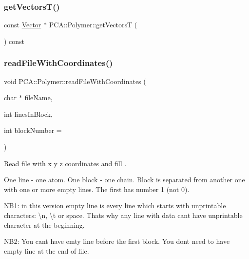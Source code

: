 \subsubsection{\texorpdfstring{get\+Vectors\+T()}{getVectorsT()}}
{\footnotesize\ttfamily const \hyperlink{class_p_c_a_1_1_vector}{Vector} $\ast$ P\+C\+A\+::\+Polymer\+::get\+VectorsT (\begin{DoxyParamCaption}{ }\end{DoxyParamCaption}) const}

\hypertarget{class_p_c_a_1_1_polymer_a777691bb321ef1da30a064757eb480c7}{}\label{class_p_c_a_1_1_polymer_a777691bb321ef1da30a064757eb480c7} 
\subsubsection{\texorpdfstring{read\+File\+With\+Coordinates()}{readFileWithCoordinates()}}
{\footnotesize\ttfamily void P\+C\+A\+::\+Polymer\+::read\+File\+With\+Coordinates (\begin{DoxyParamCaption}\item[{char $\ast$}]{file\+Name,  }\item[{int}]{lines\+In\+Block,  }\item[{int}]{block\+Number = {} }\end{DoxyParamCaption})\hspace{0.3cm}{\ttfamily [private]}}



Read file with x y z coordinates and fill . 

One line -\/ one atom. One block -\/ one chain. Block is separated from another one with one or more empty lines. The first has number 1 (not 0).

N\+B1\+: in this version empty line is every line which starts with unprintable characters\+: \textbackslash{}n, \textbackslash{}t or space. That\textquotesingle{}s why any line with data can\textquotesingle{}t have unprintable character at the beginning.

N\+B2\+: You can\textquotesingle{}t have emty line before the first block. You don\textquotesingle{}t need to have empty line at the end of file. \hypertarget{class_p_c_a_1_1_polymer_a2dae638afa952c286c16122c7ab52b6e}{}\label{class_p_c_a_1_1_polymer_a2dae638afa952c286c16122c7ab52b6e} 
